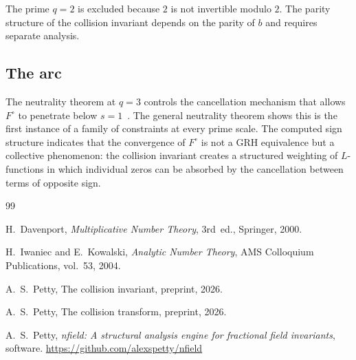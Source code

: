 \documentclass[12pt]{amsart}
\theoremstyle{definition}
\theoremstyle{remark}
\begin{document}
The prime $q = 2$ is excluded because $2$ is not
invertible modulo $2$. The parity structure of the
collision invariant depends on the parity of $b$
and requires separate analysis.

\subsection*{The arc}

The neutrality theorem at $q = 3$ controls the
cancellation mechanism that allows $F^{\circ}$ to
penetrate below $s = 1$~\cite{paperB}. The general
neutrality theorem shows this is the first instance
of a family of constraints at every prime scale. The
computed sign structure indicates that the convergence of
$F^{\circ}$ is not a GRH equivalence but a collective
phenomenon: the collision invariant creates a
structured weighting of $L$-functions in which
individual zeros can be absorbed by the cancellation
between terms of opposite sign.

\begin{thebibliography}{99}

H.~Davenport,
\emph{Multiplicative Number Theory},
3rd~ed., Springer, 2000.

H.~Iwaniec and E.~Kowalski,
\emph{Analytic Number Theory},
AMS Colloquium Publications, vol.~53, 2004.

A.~S.~Petty,
The collision invariant,
preprint, 2026.

A.~S.~Petty,
The collision transform,
preprint, 2026.

A.~S.~Petty,
\emph{nfield: A structural analysis engine for fractional
field invariants},
software.
\url{https://github.com/alexspetty/nfield}

\end{thebibliography}
\end{document}
